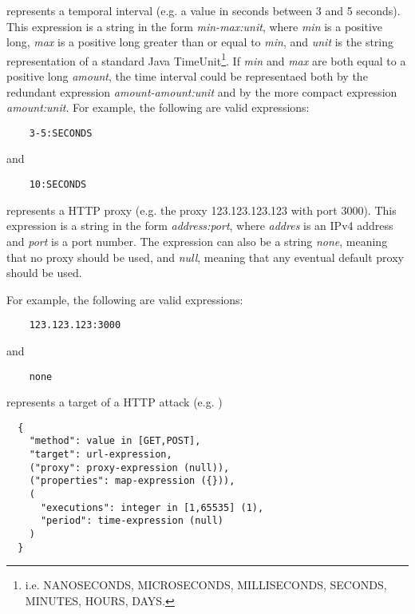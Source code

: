 \begin{description}
  \setlength\itemsep{1em}

  \item[\texttt{time-expression}] represents a temporal interval (e.g. a value in seconds between 3 and 5 seconds). This expression is a string in the form \textit{min-max:unit}, where \textit{min} is a positive long, \textit{max} is a positive long greater than or equal to \textit{min}, and \textit{unit} is the string representation of a standard Java TimeUnit\footnote{i.e. NANOSECONDS, MICROSECONDS, MILLISECONDS, SECONDS, MINUTES, HOURS, DAYS.}. If \textit{min} and \textit{max} are both equal to a positive long \textit{amount}, the time interval could be representaed both by the redundant expression \textit{amount-amount:unit} and by the more compact expression \textit{amount:unit}.
  For example, the following are valid expressions:

  \begin{verbatim}
    3-5:SECONDS
  \end{verbatim}

  and

  \begin{verbatim}
    10:SECONDS
  \end{verbatim}

  \item[\texttt{proxy-expression}] represents a HTTP proxy (e.g. the proxy 123.123.123.123 with port 3000). This expression is a string in the form \textit{address:port}, where \textit{addres} is an IPv4 address and \textit{port} is a port number. The expression can also be a string \textit{none}, meaning that no proxy should be used, and \textit{null}, meaning that any eventual default proxy should be used.

  For example, the following are valid expressions:

  \begin{verbatim}
    123.123.123:3000
  \end{verbatim}

  and

  \begin{verbatim}
    none
  \end{verbatim}

  \item[\texttt{attack-object}] represents a target of a HTTP attack (e.g. )
  \begin{verbatim}
  {
    "method": value in [GET,POST],
    "target": url-expression,
    ("proxy": proxy-expression (null)),
    ("properties": map-expression ({})),
    (
      "executions": integer in [1,65535] (1),
      "period": time-expression (null)
    )
  }
  \end{verbatim}


\end{description}
